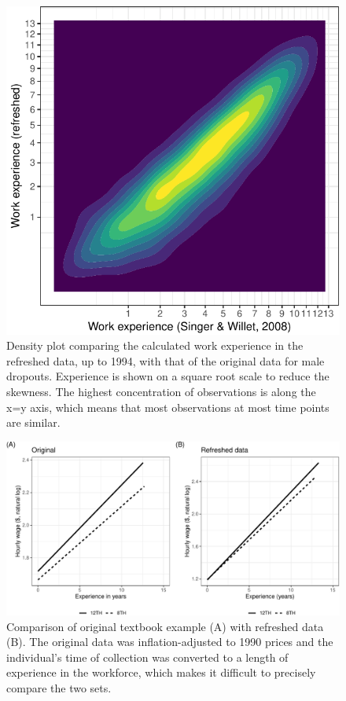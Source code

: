 \documentclass{article}
\begin{document}
\begin{figure}

{\centering \includegraphics[width=0.7\linewidth]{figures/compare-xp-sw-1} 

}

\caption{Density plot comparing the calculated work experience in the refreshed data, up to 1994, with that of the original data for male dropouts. Experience is shown on a square root scale to reduce the skewness. The highest concentration of observations is along the x=y axis, which means that most observations at most time points are similar.}\label{fig:compare-xp-sw}
\end{figure}

\begin{figure}

{\centering \includegraphics[width=1\linewidth]{figures/plotting-sw-do-1} 

}

\caption{Comparison of original textbook example (A) with refreshed data (B). The original data was inflation-adjusted to 1990 prices and the individual's time of collection was converted to a length of experience in the workforce, which makes it difficult to precisely compare the two sets.}\label{fig:plotting-sw-do}
\end{figure}
\end{document}
